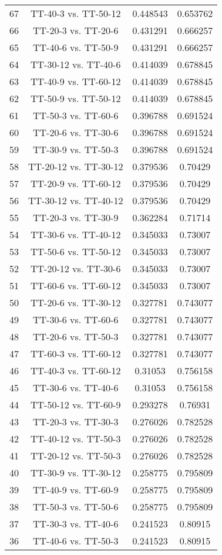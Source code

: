 \documentclass[a4paper,10pt]{article}
\begin{document}
\begin{landscape}
\begin{table}[!htp]
\begin{tabular}{cccc}
67&TT-40-3 vs. TT-50-12&0.448543&0.653762\\
66&TT-20-3 vs. TT-20-6&0.431291&0.666257\\
65&TT-40-6 vs. TT-50-9&0.431291&0.666257\\
64&TT-30-12 vs. TT-40-6&0.414039&0.678845\\
63&TT-40-9 vs. TT-60-12&0.414039&0.678845\\
62&TT-50-9 vs. TT-50-12&0.414039&0.678845\\
61&TT-50-3 vs. TT-60-6&0.396788&0.691524\\
60&TT-20-6 vs. TT-30-6&0.396788&0.691524\\
59&TT-30-9 vs. TT-50-3&0.396788&0.691524\\
58&TT-20-12 vs. TT-30-12&0.379536&0.70429\\
57&TT-20-9 vs. TT-60-12&0.379536&0.70429\\
56&TT-30-12 vs. TT-40-12&0.379536&0.70429\\
55&TT-20-3 vs. TT-30-9&0.362284&0.71714\\
54&TT-30-6 vs. TT-40-12&0.345033&0.73007\\
53&TT-50-6 vs. TT-50-12&0.345033&0.73007\\
52&TT-20-12 vs. TT-30-6&0.345033&0.73007\\
51&TT-60-6 vs. TT-60-12&0.345033&0.73007\\
50&TT-20-6 vs. TT-30-12&0.327781&0.743077\\
49&TT-30-6 vs. TT-60-6&0.327781&0.743077\\
48&TT-20-6 vs. TT-50-3&0.327781&0.743077\\
47&TT-60-3 vs. TT-60-12&0.327781&0.743077\\
46&TT-40-3 vs. TT-60-12&0.31053&0.756158\\
45&TT-30-6 vs. TT-40-6&0.31053&0.756158\\
44&TT-50-12 vs. TT-60-9&0.293278&0.76931\\
43&TT-20-3 vs. TT-30-3&0.276026&0.782528\\
42&TT-40-12 vs. TT-50-3&0.276026&0.782528\\
41&TT-20-12 vs. TT-50-3&0.276026&0.782528\\
40&TT-30-9 vs. TT-30-12&0.258775&0.795809\\
39&TT-40-9 vs. TT-60-9&0.258775&0.795809\\
38&TT-50-3 vs. TT-50-6&0.258775&0.795809\\
37&TT-30-3 vs. TT-40-6&0.241523&0.80915\\
36&TT-40-6 vs. TT-50-3&0.241523&0.80915\\

\end{tabular}
\end{table}
\end{landscape}
\end{document}
